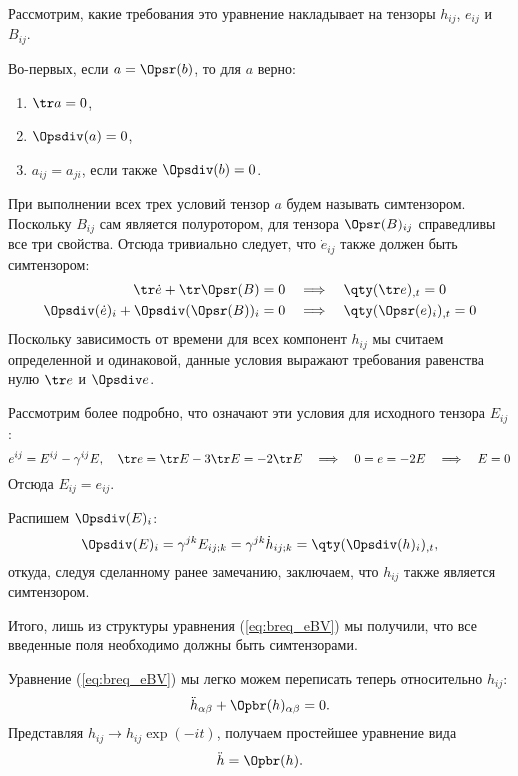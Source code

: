 \documentclass[\docroot/reports/draft/report.tex]{subfiles}
\begin{document}
    Рассмотрим, какие требования это уравнение накладывает на тензоры $h_{ij}$, $e_{ij}$ и $B_{ij}$.

    Во-первых, если $a = \Opsr(b)$, то для $a$ верно:
    \begin{enumerate}[nosep]
        \item $\tr a = 0$,
        \item $\Opsdiv(a) = 0$,
        \item $a_{ij} = a_{ji}$, если также $\Opsdiv(b) = 0$.
    \end{enumerate}

    При выполнении всех трех условий тензор $a$ будем называть симтензором. Поскольку $B_{ij}$ сам является полуротором, для тензора $\Opsr(B)_{ij}$ справедливы все три свойства. Отсюда тривиально следует, что $\dot{e}_{ij}$ также должен быть симтензором:
    \begin{align*}
        \tr \dot{e} + \tr \Opsr(B) = 0
            \quad&\Longrightarrow\quad \qty(\tr e)_{,t} = 0 \\
        \Opsdiv(\dot{e})_i + \Opsdiv(\Opsr(B))_i = 0
            \quad&\Longrightarrow\quad \qty(\Opsr(e)_i)_{,t} = 0
    \end{align*}
    Поскольку зависимость от времени для всех компонент $h_{ij}$ мы считаем определенной и одинаковой, данные условия выражают требования равенства нулю $\tr e$ и $\Opsdiv e$.

    Рассмотрим более подробно, что означают эти условия для исходного тензора $E_{ij}$:
    \begin{equation*}
        e^{ij} = E^{ij} - \gamma^{ij} E , \quad
        \tr e = \tr E - 3 \tr E = -2 \tr E \quad\Longrightarrow\quad
        0 = e = -2E \quad\Longrightarrow\quad
        E = 0
    \end{equation*}
    Отсюда $E_{ij} = e_{ij}$.

    Распишем $\Opsdiv(E)_i$:
    \begin{equation*}
        \Opsdiv(E)_i
            = \gamma^{jk} E_{ij;k}
            = \gamma^{jk} \dot{h}_{ij;k}
            = \qty(\Opsdiv(h)_i)_{,t} ,
    \end{equation*}
    откуда, следуя сделанному ранее замечанию, заключаем, что $h_{ij}$ также является симтензором.

    Итого, лишь из структуры уравнения (\ref{eq:breq_eBV}) мы получили, что все введенные поля необходимо должны быть симтензорами.

    Уравнение (\ref{eq:breq_eBV}) мы легко можем переписать теперь относительно $h_{ij}$:
    \begin{equation}
        \ddot{h}_{\alpha\beta} + \Opbr(h)_{\alpha\beta} = 0 .
    \end{equation}
    Представляя $h_{ij} \to h_{ij} \exp(-it)$, получаем простейшее уравнение вида
    \begin{equation}
        \ddot{h} = \Opbr(h) .
    \end{equation}
\end{document}
